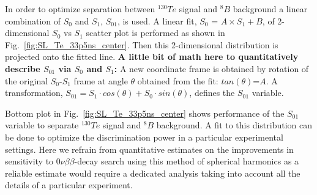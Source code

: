 \documentclass[12pt,twoside,letterpaper]{article}
\newcommand{\vbb}{0\nu\beta\beta}
\newcommand{\Te}{^{130}Te}
\newcommand{\B}{^{8}B}
\begin{document}
In order to optimize separation between $\Te$ signal and $\B$ background a linear combination of $S_0$ and $S_1$, $S_{01}$, is used. A linear fit, $S_0$ = $A \times S_1 + B$, of 2-dimensional $S_0$ vs $S_1$ scatter plot is performed as shown in Fig.~\ref{fig:SL_Te_33p5ns_center}. Then this 2-dimensional distribution is projected onto the fitted line. {\bf A little bit of math here to quantitatively describe $S_{01}$ via $S_0$ and $S_1$:} A new coordinate frame is obtained by rotation of the original $S_0$-$S_1$ frame at angle $\theta$ obtained from the fit: $tan(\theta)$=$A$. A transformation, $S_{01} = S_1 \cdot cos(\theta) + S_0 \cdot sin(\theta)$, defines the $S_{01}$ variable.

Bottom plot in Fig.~\ref{fig:SL_Te_33p5ns_center} shows performance of the $S_{01}$ variable to separate $\Te$ signal and $\B$ background. A fit to this distribution can be done to optimize the discrimination power in a particular experimental settings. Here we refrain from quantitative estimates on the improvements in sensitivity to $\vbb$-decay search using this method of spherical harmonics as a reliable estimate would require a dedicated analysis taking into account all the details of a particular experiment.
\end{document}
